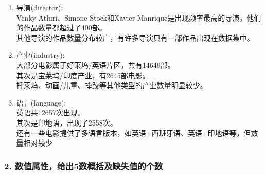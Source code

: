 \documentclass[11pt]{article}
\begin{document}
\begin{enumerate}
\def\labelenumi{\arabic{enumi}.}
\setcounter{enumi}{1}
\item
  导演(director):\\
  Venky Atluri、Simone Stock和Xavier
  Manrique是出现频率最高的导演，他们的作品数量都超过了400部。\\
  其他导演的作品数量分布较广，有许多导演只有一部作品出现在数据集中。
\item
  产业(industry):\\
  大部分电影属于好莱坞/英语片区，共有14649部。\\
  其次是宝莱坞/印度产业，有2645部电影。\\
  托莱坞、动画/儿童、摔跤等其他类型的产业数量明显较少。
\item
  语言(language):\\
  英语共12657次出现。\\
  其次是印地语，出现了2558次。\\
  还有一些电影提供了多语言版本，如英语+西班牙语、英语+印地语等，但数量相对较少
\end{enumerate}

    \subsubsection{2.
数值属性，给出5数概括及缺失值的个数}\label{ux6570ux503cux5c5eux6027ux7ed9ux51fa5ux6570ux6982ux62ecux53caux7f3aux5931ux503cux7684ux4e2aux6570}
\end{document}
